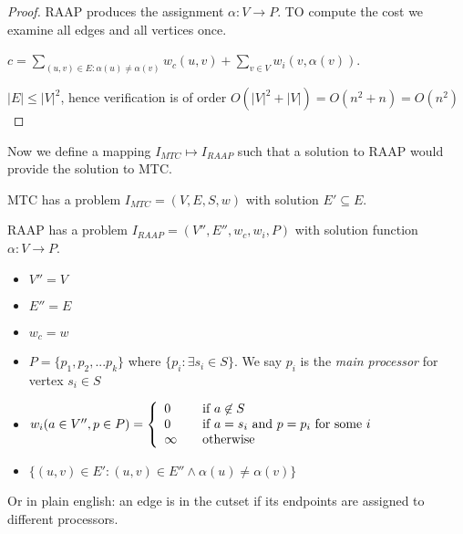 \documentclass{article}
\begin{document}
\begin{proof}
RAAP produces the assignment $\alpha : V \rightarrow P$.
TO compute the cost we examine all edges and all vertices once.

$c = \displaystyle\sum\limits_{(u,v) \in E : \alpha(u) \neq \alpha(v)} w_c(u,v) + \displaystyle\sum\limits_{v \in V} w_i(v, \alpha(v))$.

$|E| \leq |V|^2$, hence verification is of order $O(|V|^2 + |V|) = O(n^2 + n) = O(n^2)$
\end{proof}

Now we define a mapping $I_{MTC} \mapsto I_{RAAP}$ such that a solution to RAAP would provide the solution to MTC.

MTC has a problem $I_{MTC} = (V,E,S,w)$ with solution $E' \subseteq E$.

RAAP has a problem $I_{RAAP} = (V'',E'',w_c,w_i,P)$ with solution function $\alpha : V \rightarrow P$.

\begin{itemize}
	\item $V'' = V$
	\item $E'' = E$
	\item $w_c = w$
	\item $P = \{p_1, p_2, ... p_k\}$ where $\{p_i : \exists s_i \in S \}$.  We say $p_i$ is the {\em main processor} for vertex $s_i \in S$
	\item $w_i(a \in V'',p \in P) = \left\{ 
		\begin{array}{l l}
			0 & \quad \mbox{if $a \not\in S$}\\
			0 & \quad \mbox{if $a = s_i$ and $p = p_i$ for some $i$}\\
			\infty & \quad \mbox{otherwise}\\ \end{array} \right.$
	\item $\{(u,v) \in E' : (u,v) \in E'' \wedge \alpha(u) \neq \alpha(v)\}$
\end{itemize}

Or in plain english: an edge is in the cutset if its endpoints are assigned to different processors.
\end{document}
